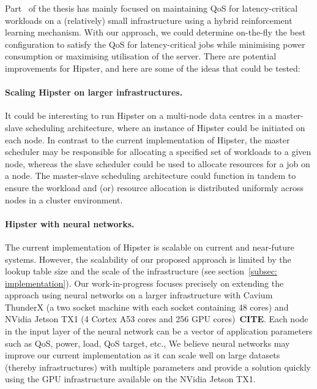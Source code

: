  Part~ of the thesis has mainly focused on maintaining QoS for
latency-critical workloads on a (relatively) small infrastructure using a hybrid
reinforcement learning mechanism. With our approach, we could determine on-the-fly the
best configuration to satisfy the QoS for latency-critical jobs while minimising power
consumption or maximising utilisation of the server. There are potential improvements for
Hipster, and here are some of the ideas that could be tested:


 \paragraph{Scaling Hipster on larger infrastructures.} It could be
interesting to run Hipster on a multi-node data centres in a master-slave scheduling
architecture, where an instance of Hipster could be initiated on each node. In contrast to
the current implementation of Hipster, the master scheduler may be responsible for
allocating a specified set of workloads to a given node, whereas the slave scheduler could
be used to allocate resources for a job on a node.  The master-slave scheduling
architecture could function in tandem to ensure the workload and (or) resource allocation
is distributed uniformly across nodes in a cluster environment. 

\iffalse


 \paragraph{Hipster with neural networks.} The current implementation of
Hipster is scalable on current and near-future systems. However, the scalability of our
proposed approach is limited by the lookup table size and the scale of the infrastructure
(see section~\ref{subsec: implementation}). Our work-in-progress focuses precisely on
extending the approach using neural networks on a larger infrastructure with Cavium
ThunderX (a two socket machine with each socket containing 48 cores) and NVidia Jetson TX1
(4 Cortex A53 cores and 256 GPU cores)~\textbf{CITE}. Each node in the input layer of the
neural network can be a vector of application parameters such as QoS, power, load, QoS
target, etc., We believe neural networks may improve our current implementation as it can
scale well on large datasets (thereby infrastructures) with multiple parameters and
provide a solution quickly using the GPU infrastructure available on the NVidia Jetson
TX1. 

